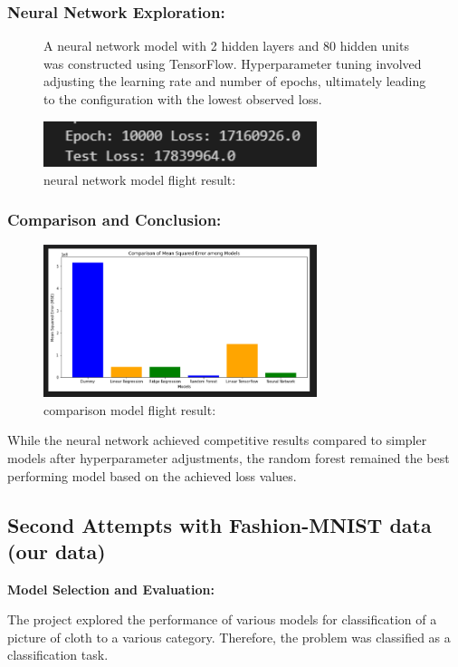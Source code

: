\documentclass{article}
\begin{document}
\subsubsection{Neural Network Exploration:}

\begin{figure}[H]
    A neural network model with 2 hidden layers and 80 hidden units was constructed using TensorFlow. Hyperparameter tuning involved adjusting the learning rate and number of epochs, ultimately leading to the configuration with the lowest observed loss.
    \caption{neural network model flight result:}
    \centering
    \includegraphics[width=8cm]{imgFolder/neuronNetworkFlight.png}
\end{figure}

\subsubsection{Comparison and Conclusion:}
\begin{figure}[H]
    \caption{comparison model flight result:}
    \centering
    \includegraphics[width=8cm]{imgFolder/comparisonFlight.png}
\end{figure}
While the neural network achieved competitive results compared to simpler models after hyperparameter adjustments, the random forest remained the best performing model based on the achieved loss values.

\subsection{Second Attempts with Fashion-MNIST data (our data)}
\textbf{Model Selection and Evaluation:}

The project explored the performance of various models for classification of a picture of cloth to a various category. Therefore, the problem was classified as a classification task.
\end{document}
